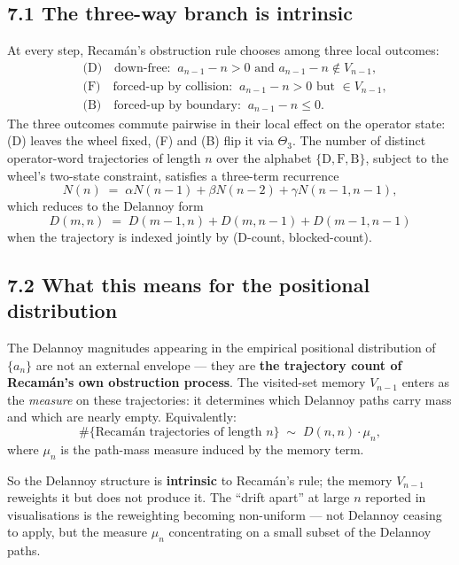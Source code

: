 \documentclass[
  11pt,
]{article}
\begin{document}
\hypertarget{the-three-way-branch-is-intrinsic}{%
\subsection{7.1 The three-way branch is
intrinsic}\label{the-three-way-branch-is-intrinsic}}

At every step, Recamán's obstruction rule chooses among three local
outcomes: \[
\begin{aligned}
& \text{(D)}\quad \text{down-free:}\;\; a_{n-1} - n > 0 \text{ and } a_{n-1} - n \notin V_{n-1}, \\
& \text{(F)}\quad \text{forced-up by collision:}\;\; a_{n-1} - n > 0 \text{ but } \in V_{n-1}, \\
& \text{(B)}\quad \text{forced-up by boundary:}\;\; a_{n-1} - n \le 0.
\end{aligned}
\] The three outcomes commute pairwise in their local effect on the
operator state: (D) leaves the wheel fixed, (F) and (B) flip it via
\(\Theta_3\). The number of distinct operator-word trajectories of
length \(n\) over the alphabet \(\{\text{D}, \text{F}, \text{B}\}\),
subject to the wheel's two-state constraint, satisfies a three-term
recurrence \[
N(n) \;=\; \alpha N(n-1) + \beta N(n-2) + \gamma N(n-1, n-1),
\] which reduces to the Delannoy form \[
D(m, n) \;=\; D(m-1, n) + D(m, n-1) + D(m-1, n-1)
\] when the trajectory is indexed jointly by (D-count, blocked-count).

\hypertarget{what-this-means-for-the-positional-distribution}{%
\subsection{7.2 What this means for the positional
distribution}\label{what-this-means-for-the-positional-distribution}}

The Delannoy magnitudes appearing in the empirical positional
distribution of \(\{a_n\}\) are not an external envelope --- they are
\textbf{the trajectory count of Recamán's own obstruction process}. The
visited-set memory \(V_{n-1}\) enters as the \emph{measure} on these
trajectories: it determines which Delannoy paths carry mass and which
are nearly empty. Equivalently: \[
\#\{\text{Recamán trajectories of length } n\} \;\sim\; D(n, n) \cdot \mu_n,
\] where \(\mu_n\) is the path-mass measure induced by the memory term.

So the Delannoy structure is \textbf{intrinsic} to Recamán's rule; the
memory \(V_{n-1}\) reweights it but does not produce it. The ``drift
apart'' at large \(n\) reported in visualisations is the reweighting
becoming non-uniform --- not Delannoy ceasing to apply, but the measure
\(\mu_n\) concentrating on a small subset of the Delannoy paths.
\end{document}
